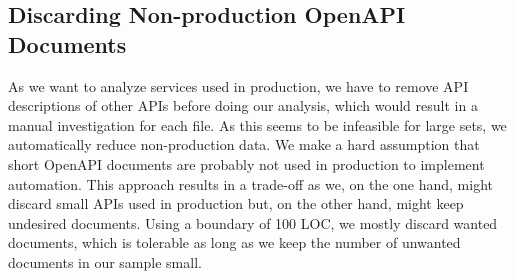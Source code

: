 \subsection{Discarding Non-production OpenAPI Documents}
As we want to analyze services used in production, we have to remove API descriptions of other APIs before doing our analysis, which would result in a manual investigation for each file. As this seems to be infeasible for large sets, we automatically reduce non-production data. We make a hard assumption that short OpenAPI documents are probably not used in production to implement automation. This approach results in a trade-off as we, on the one hand, might discard small APIs used in production but, on the other hand, might keep undesired documents. Using a boundary of 100 LOC, we mostly discard wanted documents, which is tolerable as long as we keep the number of unwanted documents in our sample small.